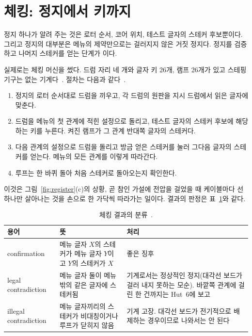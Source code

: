 \section{체킹: 정지에서 키까지}\label{sec:checking}

정지 하나가 알려 주는 것은 로터 순서, 코어 위치, 테스트 글자의 스테커 후보뿐이다. 그리고 정지의
대부분은 메뉴의 제약만으로는 걸러지지 않은 거짓 정지다. 정지를 검증하고 나머지 스테커를 얻는 단계가
이다.

실제로는 체킹 머신을 썼다. 드럼 자리 네 개와 글자 키 26개, 램프 26개가 있고 스테핑 기구는
없는 기계다~\cite[12, 74]{us6812report1944}. 절차는 다음과 같다~\cite[12--16, 49--50]{us6812report1944}.

\begin{enumerate}
\item 정지의 로터 순서대로 드럼을 끼우고, 각 드럼의 원판을 지시 드럼에서 읽은 글자에 맞춘다.
\item 드럼을 메뉴의 첫 관계에 적힌 설정으로 돌리고, 테스트 글자의 스테커 후보에 해당하는 키를 누른다.
켜진 램프가 그 관계 반대쪽 글자의 스테커다.
\item 다음 관계의 설정으로 드럼을 돌리고 방금 얻은 스테커를 눌러 그다음 글자의 스테커를 얻는다.
메뉴의 모든 관계를 이렇게 따라간다.
\item 루프는 한 바퀴 돌아 처음 스테커로 돌아오는지 확인한다.
\end{enumerate}

이것은 그림~\ref{fig:register}(c)의 상황, 곧 참인 가설에 전압을 걸었을 때 케이블마다 선 하나만 살아나는
것을 손으로 한 가닥씩 따라가는 일이다. 결과의 판정은 표~\ref{tab:verdicts}와 같다.

\begin{table}[ht]
\centering
\caption{체킹 결과의 분류~\cite[12--16, 49--50]{us6812report1944}.}
\label{tab:verdicts}
\small
\begin{tabularx}{\linewidth}{l>{\raggedright\arraybackslash}X>{\raggedright\arraybackslash}X}
\toprule
용어 & 뜻 & 처리 \\
\midrule
confirmation & 메뉴 글자 $X$의 스테커가 메뉴 글자 $Y$이고 $Y$의 스테커가 $X$ & 좋은 징후 \\
legal contradiction & 메뉴 글자 둘이 메뉴 밖의 같은 글자에 스테커됨 & 기계로서는 정상적인 정지(대각선 보드가 걸러 내지 못하는 모순). 바깥쪽 관계에 걸린 한 건까지는 Hut~6에 보고 \\
illegal contradiction & 메뉴 글자끼리의 스테커가 비대칭이거나 루프가 닫히지 않음 & 기계 고장. 대각선 보드가 전기적으로 배제하는 경우이므로 나와서는 안 된다 \\
\bottomrule
\end{tabularx}
\end{table}

